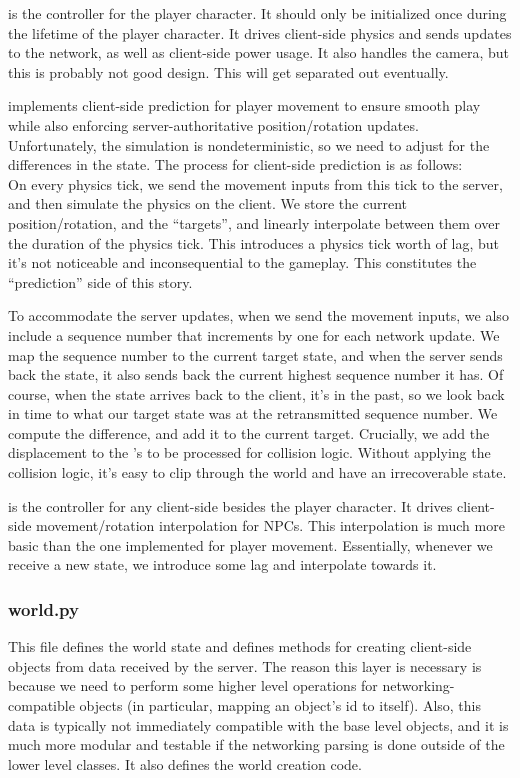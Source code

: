\documentclass{article}
\begin{document}
 is the controller for the player character. It should only be initialized
once during the lifetime of the player character. It drives client-side physics and sends updates
to the network, as well as client-side power usage. It also handles the camera, but this is
probably not good design. This will get separated out eventually.

 implements client-side prediction for player movement
to ensure smooth play while also enforcing server-authoritative position/rotation updates.
Unfortunately, the simulation is nondeterministic, so we need to adjust for the differences in the state.
The process for client-side prediction is as follows:\\
On every physics tick, we send the movement inputs from this tick to
the server, and then simulate the physics on the client. We store the
current position/rotation, and the ``targets'', and linearly interpolate
between them over the duration of the physics tick. This introduces a
physics tick worth of lag, but it's not noticeable and inconsequential
to the gameplay. This constitutes the ``prediction'' side of this story.

To accommodate the server updates, when we send the movement inputs, we
also include a sequence number that increments by one for each network update.
We map the sequence number to the current target state, and
when the server sends back the state, it also sends back the current
highest sequence number it has. Of course, when the state arrives back
to the client, it's in the past, so we look back in time to what our
target state was at the retransmitted sequence number. We compute the
difference, and add it to the current target. Crucially, we add the
displacement to the 's 
to be processed for collision logic. Without applying the collision logic, it's easy to clip through
the world and have an irrecoverable state.

 is the controller for any client-side  besides the
player character. It drives client-side movement/rotation interpolation for NPCs. This
interpolation is much more basic than the one implemented for player movement. Essentially,
whenever we receive a new state, we introduce some lag and interpolate towards it. 
\subsubsection{world.py}
This file defines the world state and defines methods for creating client-side objects from
data received by the server. The reason this layer is necessary is because we need to perform
some higher level operations for networking-compatible objects (in particular, mapping an object's
id to itself). Also, this data is typically not immediately compatible with the base level objects,
and it is much more modular and testable if the networking parsing is done outside of the lower level
classes. It also defines the world creation code.
\end{document}
